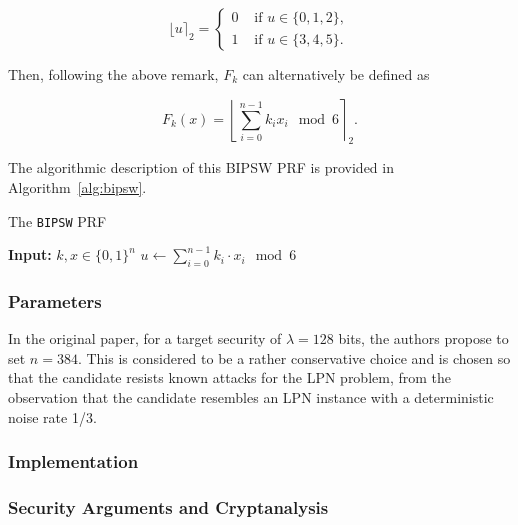 \begin{equation*}
\lfloor u \rceil_2 = \left\{
\begin{array}{rl}
0 & \text{ if } u \in \{0,1,2\}, \\
1 & \text{ if } u \in \{3,4,5\}.
\end{array}
\right.
\end{equation*}

Then, following the above remark, $F_k$ can alternatively be defined as

 \begin{equation} \label{eq:bipsw}
F_k(x) = \left\lfloor \sum_{i = 0}^{n-1} k_i x_i  \mod{6} \right\rceil_2.
\end{equation}

The algorithmic description of this BIPSW PRF is provided in Algorithm~\ref{alg:bipsw}. 
 
 \begin{algorithm}
  \caption{\label{alg:bipsw}The {\tt BIPSW} PRF} 
  \begin{algorithmic} 
  \State \textbf{Input:} $k,x \in \{0,1\}^n$
    \State $u \leftarrow \sum_{i=0}^{n-1} k_i \cdot x_i \mod 6$ 
    \State	{} 
    \Else
    	\State { }
     \EndIf
  \end{algorithmic}
\end{algorithm}





\subsubsection*{Parameters}
In the original paper, for a target security of $\lambda = 128$ bits, the authors propose to set $n = 384$. This is considered to be a rather conservative choice and is chosen so that the candidate resists known attacks for the LPN problem, from the observation that the candidate resembles an LPN instance with a deterministic noise rate 1/3.


\subsubsection*{Implementation}



    

\subsubsection*{Security Arguments and Cryptanalysis}

